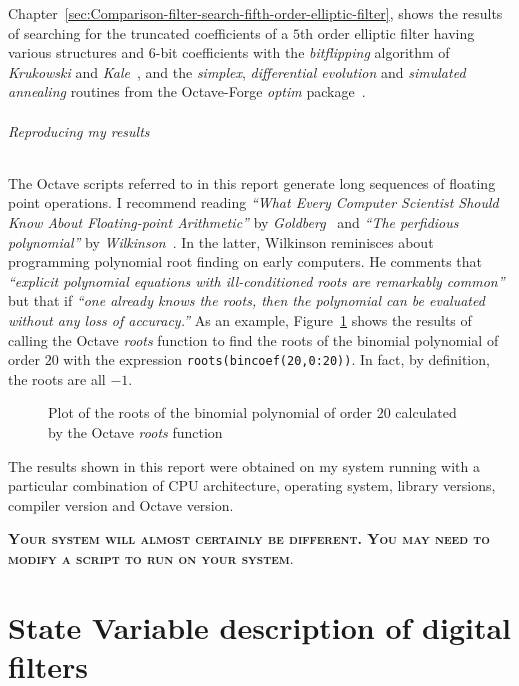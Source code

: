 \documentclass[a4paper,twoside,10pt,english]{report}
\begin{document}
Chapter~\ref{sec:Comparison-filter-search-fifth-order-elliptic-filter}, 
shows the results of searching for the truncated coefficients of a $5$th order 
elliptic filter having various structures and $6$-bit coefficients with the
\emph{bitflipping} algorithm of \emph{Krukowski} and
\emph{Kale}~\cite{KrukowskiKale_FixedPointFilterDesignBitFlippingSimplex}, and
the \emph{simplex}, \emph{differential evolution} and \emph{simulated annealing}
routines from the Octave-Forge \emph{optim} 
package~\cite{OctaveForge_OptimPackage}.

\paragraph{Reproducing my results}
The Octave scripts referred to in this report generate long sequences of floating
point operations. I recommend reading \emph{``What Every Computer Scientist
  Should Know About Floating-point Arithmetic''} by
\emph{Goldberg}~\cite{Goldberg_FloatingPoint} and \emph{``The perfidious
  polynomial''} by \emph{Wilkinson}~\cite{Wilkinson_PerfidiousPolynomial}. In
the latter, Wilkinson reminisces about programming polynomial root finding on
early computers. He comments that \emph{``explicit polynomial equations with
  ill-conditioned roots are remarkably common''} but that if \emph{``one
  already knows the roots, then the polynomial can be evaluated without any
  loss of accuracy.''} As an example, Figure~\ref{fig:bincoeff-test-zeros}
shows the results of calling the Octave \emph{roots} function to find the
roots of the binomial polynomial of order $20$ with the expression
\texttt{roots(bincoef(20,0:20))}. In fact, by definition, the roots are all
$-1$.
\begin{figure}[!htbp]
\begin{center}
\scalebox{0.7}{}
\caption{Plot of the roots of the binomial polynomial of order
      $20$ calculated by the Octave \emph{roots} function}
\label{fig:bincoeff-test-zeros}
\end{center}
\end{figure}

The results shown in this report were obtained on my system running with a
particular combination of CPU architecture, operating system, library
versions, compiler version and Octave version.

\textsc{\textbf{Your system will almost certainly be
    different. You may need to modify a script to run on your system}}.
\cleardoublepage{}
\part{\label{part:State-Variable-digital-filters}State Variable description of digital filters}
\cleardoublepage{}
\end{document}
